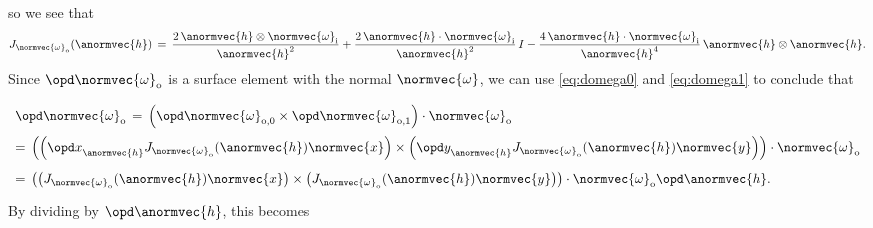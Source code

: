 %
so we see that
%
\begin{equation}
J_{\normvec{\omega}_{\text{o}}}(\anormvec{h}) \,=\,
\frac{2\,\anormvec{h}\otimes\normvec{\omega}_{\text{i}}}{\anormvec{h}^2} +
\frac{2\,\anormvec{h}\cdot\normvec{\omega}_{\text{i}}}{\anormvec{h}^2}\,I -
\frac{4\,\anormvec{h}\cdot\normvec{\omega}_{\text{i}}}{\anormvec{h}^4}\,\anormvec{h}\otimes\anormvec{h}.
\end{equation}
%
Since $\opd\normvec{\omega}_{\text{o}}$ is a surface element with the normal $\normvec{\omega}$, we can use  \eqref{eq:domega0} and \eqref{eq:domega1} to conclude that 
%
\begin{equation} \label{eq:domega}
\renewcommand*{\arraystretch}{2}
\begin{array}{l}
\displaystyle \opd\normvec{\omega}_{\text{o}} \,=\, \left(\opd\normvec{\omega}_{\text{o},0}\times\opd\normvec{\omega}_{\text{o},1}\right)\cdot\normvec{\omega}_{\text{o}} \\
=\, \left(\left(\opd x_{\anormvec{h}}^{\,}J_{\normvec{\omega}_{\text{o}}}(\anormvec{h})\normvec{x}\right)\times\left(\opd y_{\anormvec{h}}^{\,}J_{\normvec{\omega}_{\text{o}}}(\anormvec{h})\normvec{y}\right)\right)\cdot\normvec{\omega}_{\text{o}} \\
=\, \left(\left(J_{\normvec{\omega}_{\text{o}}}(\anormvec{h})\normvec{x}\right)\times\left(J_{\normvec{\omega}_{\text{o}}}(\anormvec{h})\normvec{y}\right)\right)\cdot\normvec{\omega}_{\text{o}}\opd\anormvec{h}.
\end{array}
\end{equation}
%
By dividing by $\opd\anormvec{h}$, this becomes
%

